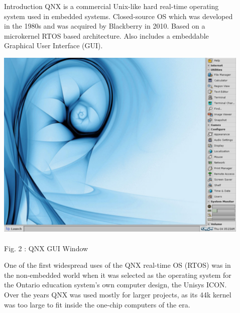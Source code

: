 \documentclass[final]{beamer}
\newlength{\sepwid}
\newlength{\onecolwid}
\newlength{\twocolwid}
\begin{document}
\begin{frame}[t]
\begin{columns}[t]
\begin{column}{\onecolwid}
\begin{block}{Introduction}
         QNX is a commercial Unix-like hard real-time operating system used in embedded systems.
Closed-source OS which was developed in the 1980s and was acquired by Blackberry in 2010.
Based on a microkernel RTOS based architecture. Also includes a embeddable Graphical User Interface (GUI).
\vspace{10mm}
\vfill
   \begin{center}
 \includegraphics[width=17cm]{QNX_6.4.1_screenshot.png}
 \\
 \\
 \caption{Fig. 2 :  QNX GUI Window}
        \end{center}
\vspace{5mm}
\vfill
One of the first widespread uses of the QNX real-time OS (RTOS) was in the non-embedded world when it was selected as the operating system for the Ontario education system's own computer design, the Unisys ICON. Over the years QNX was used mostly for larger projects, as its 44k kernel was too large to fit inside the one-chip computers of the era. 
    
\end{block}
\end{column} %

\begin{column}{\sepwid}\end{column} %

\begin{column}{\twocolwid} %

\begin{columns}[t,totalwidth=\twocolwid] %


\end{columns}
\end{column}
\end{columns}
\end{frame}
\end{document}
